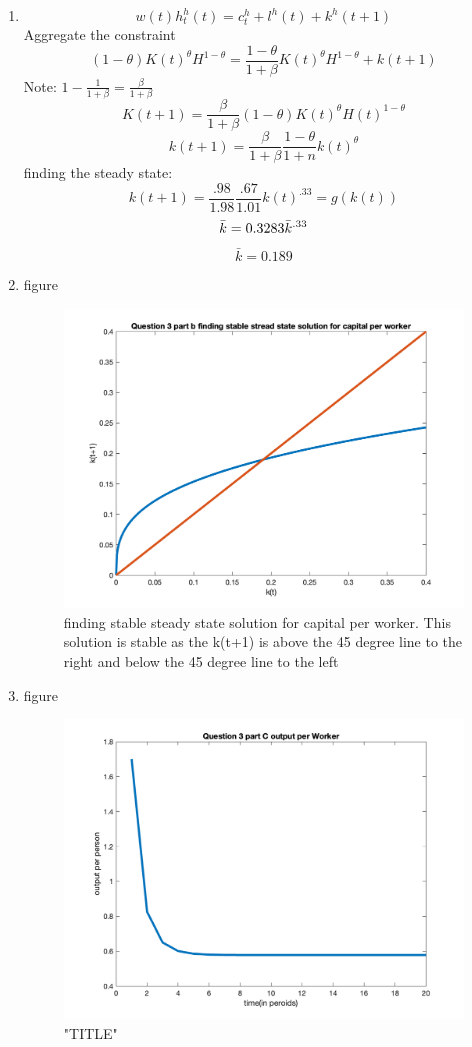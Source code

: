 \begin{enumerate}
    \item  
   $$ w(t)h^h_t(t)=c^h_t+l^h(t)+k^h(t+1)$$
   Aggregate the constraint
   $$(1-\theta)K(t)^\theta H^{1-\theta}=\frac{1-\theta}{1+\beta}K(t)^\theta H^{1-\theta}+k(t+1)$$
   Note: $1-\frac{1}{1+\beta}=\frac{\beta}{1+\beta}$
   $$K(t+1)=\frac{\beta}{1+\beta}(1-\theta)K(t)^\theta H(t)^{1-\theta}$$
   $$k(t+1)=\frac{\beta}{1+\beta}\frac{1-\theta}{1+n}k(t)^\theta$$
   finding the steady state:
    $$k(t+1)=\frac{.98}{1.98}\frac{.67}{1.01}k(t)^{.33}=g(k(t))$$
     $$\bar{k}=0.3283\Bar{k}^{.33}$$
     $$\bar{k}=0.189$$
     \item figure
     \begin{figure}[H]
        \centering
        \includegraphics[width =.75\linewidth]{HW2/pics/HW1_Q3_b.png}
        \caption{finding stable steady state solution for capital per worker. This solution is stable as the k(t+1) is above the 45 degree line to the right and below the 45 degree line to the left}
    \end{figure}
    
         \item figure
     \begin{figure}[H]
        \centering
        \includegraphics[width =.75\linewidth]{HW2/pics/HW1_Q3_c_output.png}
        \caption{"TITLE"}
    \end{figure}


\end{enumerate}
